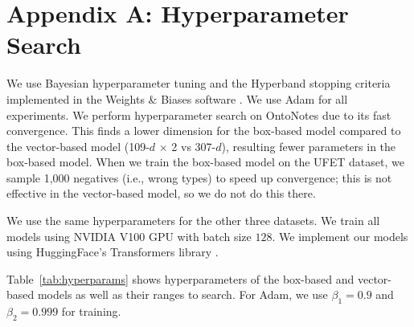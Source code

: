 \documentclass[11pt,a4paper]{article}
\begin{document}




\newpage
\appendix

\section*{Appendix A: Hyperparameter Search}\label{app:hyperparams}

We use Bayesian hyperparameter tuning and the Hyperband stopping criteria \citep{Lisha_Li_17} implemented in the Weights \& Biases software \citep{wandb}. We use Adam \citep{Kingma_14} for all experiments.  We perform hyperparameter search on OntoNotes due to its fast convergence. This finds a lower dimension for the box-based model compared to the vector-based model (109-$d$ $\times$ 2 vs 307-$d$), resulting fewer parameters in the box-based model. When we train the box-based model on the UFET dataset, we sample 1,000 negatives (i.e., wrong types) to speed up convergence; this is not effective in the vector-based model, so we do not do this there.

We use the same hyperparameters for the other three datasets. We train all models using NVIDIA V100 GPU with batch size $128$. We implement our models using HuggingFace's Transformers library \citep{Thomas_Wolf_20}.

Table~\ref{tab:hyperparams} shows hyperparameters of the box-based and vector-based models as well as their ranges to search. For Adam, we use $\beta_1 = 0.9$ and $\beta_2 = 0.999$ for training. 
\end{document}

